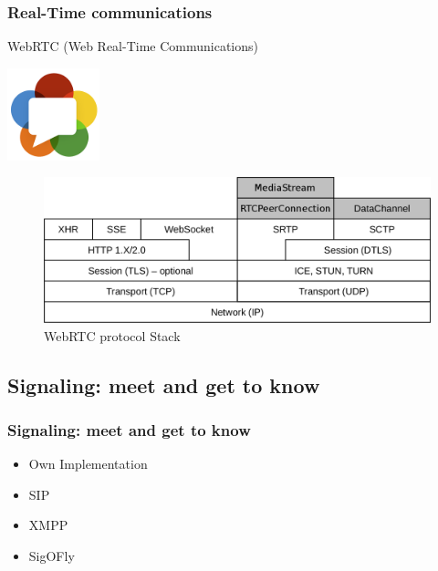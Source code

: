 \documentclass[t]{beamer}
\begin{document}
		\begin{frame}[c]
		\frametitle{Real-Time communications}

		WebRTC (Web Real-Time Communications)

		\begin{flushright}
			\vspace*{-2\baselineskip}
			\includegraphics[width=0.2\textwidth]{figures/webrtc.png}
		\end{flushright}

		\begin{figure}[H]
			\vspace*{-2\baselineskip}
			\includegraphics[width=\textwidth]{figures/webrtc_stack2.png}
			\caption{WebRTC protocol Stack}
		\end{figure}
		\end{frame}



	\subsection{Signaling: meet and get to know}
  		\begin{frame}[c]
		\frametitle{Signaling: meet and get to know}
		\begin{itemize}
		\item Own Implementation
		\vfill
		\item SIP
		\vfill
		\item XMPP
		\vfill
		\item SigOFly
		\end{itemize}
		\end{frame}
\end{document}
